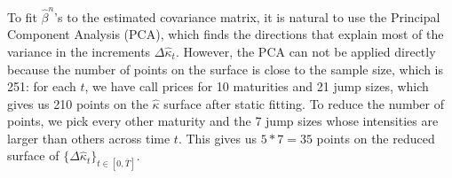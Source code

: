 \documentclass{article}
\numberwithin{equation}{section}
\def\hbeta{\hat{\beta}}
\def\bT{\bar{T}}
\def\hkappa{\hat{\kappa}}
\begin{document}
To fit $\hbeta^n$'s to the estimated covariance matrix, it is natural to use the Principal Component Analysis (PCA), which finds the directions that explain most of the variance in the increments $\Delta\hkappa_t$. 
However, the PCA can not be applied directly because the number of points on the surface is close to the sample size, which is 251: for each $t$, we have call prices for 10 maturities and 21 jump sizes, which gives us 210 points on the $\hkappa$ surface after static fitting. To reduce the number of points, we pick every other maturity and the 7 jump sizes whose intensities are larger than others across time $t$. This gives us $5*7 = 35$ points on the reduced surface of $\{\Delta \hkappa_t\}_{t\in[0,\bT]}$. 
\end{document}
